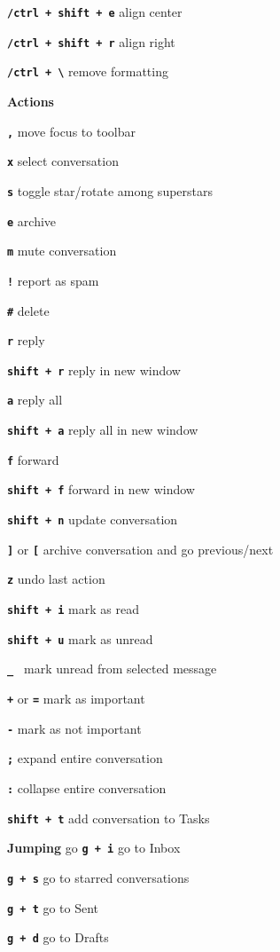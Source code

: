 \documentclass[11pt,letterpaper]{article}
\newcommand{\sck}[1]{\textbf{\texttt{#1}}}
\newcommand{\hdr}[1]{\vspace{1em}\textbf{\textsf \large #1}\vspace{0.5em}}
\begin{document}
\sck{\cmd/ctrl + shift + e} \dotfill align center

\sck{\cmd/ctrl + shift + r} \dotfill align right

\sck{\cmd/ctrl + \textbackslash } \dotfill remove formatting

\hdr{Actions}

\sck{,} \dotfill move focus to toolbar

\sck{x} \dotfill select conversation

\sck{s} \dotfill toggle star/rotate among superstars

\sck{e} \dotfill archive

\sck{m} \dotfill mute conversation

\sck{!} \dotfill report as spam

\sck{\#} \dotfill delete

\sck{r} \dotfill reply

\sck{shift + r} \dotfill reply in new window

\sck{a} \dotfill reply all

\sck{shift + a} \dotfill reply all in new window

\sck{f} \dotfill forward

\sck{shift + f} \dotfill forward in new window

\sck{shift + n} \dotfill update conversation

\sck{]} or \sck{[} \dotfill archive conversation and go previous/next

\sck{z} \dotfill undo last action

\sck{shift + i} \dotfill mark as read

\sck{shift + u} \dotfill mark as unread

\sck{\_ } \dotfill mark unread from selected message

\sck{+} or \sck{=} \dotfill mark as important

\sck{-} \dotfill mark as not important

\sck{;} \dotfill expand entire conversation

\sck{:} \dotfill collapse entire conversation

\sck{shift + t} \dotfill add conversation to Tasks

\hdr{Jumping}
go
\sck{g + i} \dotfill go to Inbox	

\sck{g + s} \dotfill go to starred conversations	

\sck{g + t} \dotfill go to Sent	

\sck{g + d} \dotfill go to Drafts	
\end{document}
